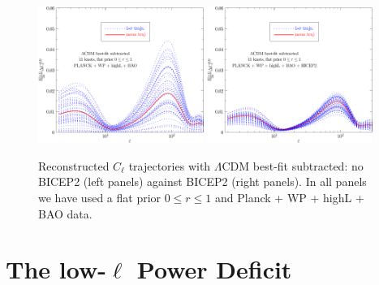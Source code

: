 \documentclass[11pt]{article}
\def \halffigwidth{0.48\textwidth}
\begin{document}
\begin{figure}
\includegraphics[width = \halffigwidth]{nobicep_spline0_p11_dclBB_trajs.pdf}%
\includegraphics[width = \halffigwidth]{spline0_p11_dclBB_trajs.pdf}
\caption{Reconstructed $C_\ell$ trajectories with $\Lambda$CDM best-fit subtracted: no BICEP2 (left panels) against BICEP2 (right panels). In all panels we have used a flat prior $0\le r\le 1$ and Planck + WP + highL + BAO data.  \label{fig:traj_cls}}
\end{figure}


\section{The low-$\ell$ Power Deficit \label{sec:anomaly}}
\end{document}
